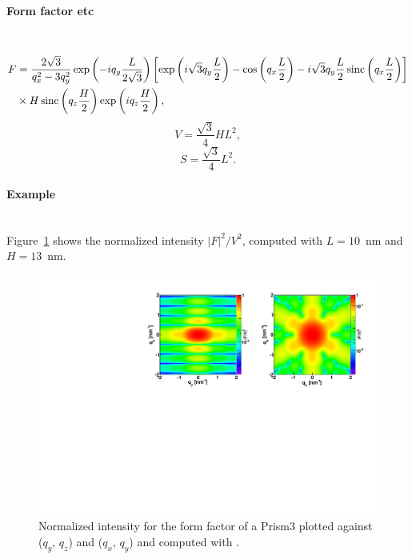 \paragraph{Form factor etc}\strut\\
\begin{align*}
F &= \frac{2 \sqrt{3}}{q_x^2-3q_y^2} 
     \exp\left(-i q_y\frac{L}{2\sqrt{3}}\right)
    \left[\exp\left(i \sqrt{3} q_y \frac{L}{2} \right)-\cos\left(q_x \frac{L}{2}\right)
    -i \sqrt{3} q_y \frac{L}{2} \operatorname{sinc}\left(q_x \frac{L}{2}\right) \right] \\
  &
  \times  H \operatorname{sinc}\left(q_z \frac{H}{2} \right) \exp\left(i q_z \frac{H}{2}\right),
\end{align*}
\begin{equation*}
  V= \dfrac{\sqrt{3}}{4} H L^2,
\end{equation*}
\begin{equation*}
  S =\dfrac{\sqrt{3}}{4}L^2.
\end{equation*}

\paragraph{Example}\strut\\
Figure~\ref{fig:FFprism3Ex} shows the normalized intensity
$|F|^2/V^2$, computed with $L=10$~nm and \mbox{$H=13$~nm.}
\begin{figure}[h]
\begin{center}
\includegraphics[angle=-90,width=\textwidth]{fig/ff/figffprism3.pdf}
\end{center}
\caption{Normalized intensity for the form factor of a Prism3
 plotted against ($q_y$, $q_z$) and  ($q_x$, $q_y$) and
  computed with .}
\label{fig:FFprism3Ex}
\end{figure}

